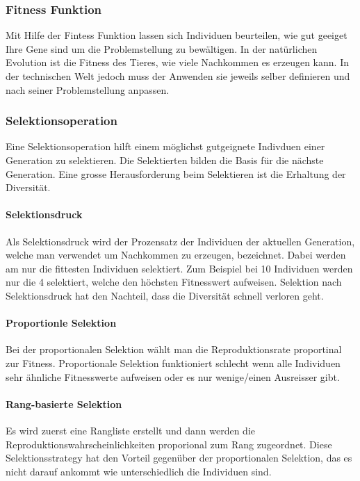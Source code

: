    \subsubsection{Fitness Funktion}
      Mit Hilfe der Fintess Funktion lassen sich Individuen beurteilen, wie gut geeiget Ihre Gene sind um die Problemstellung zu bewältigen.
      In der natürlichen Evolution ist die Fitness des Tieres, wie viele Nachkommen es erzeugen kann. In der technischen Welt jedoch muss der
      Anwenden sie jeweils selber definieren und nach seiner Problemstellung anpassen.

    \subsubsection{Selektionsoperation}
      Eine Selektionsoperation hilft einem möglichst gutgeignete Indivduen einer Generation zu selektieren.
      Die Selektierten bilden die Basis für die nächste Generation. Eine grosse Herausforderung beim Selektieren ist die Erhaltung der Diversität.

      \paragraph{Selektionsdruck}
        Als Selektionsdruck wird der Prozensatz der Individuen der aktuellen Generation, welche man verwendet um Nachkommen zu erzeugen, bezeichnet.
        Dabei werden am nur die fittesten Individuen selektiert. Zum Beispiel bei 10 Individuen werden nur die 4 selektiert, welche den höchsten Fitnesswert aufweisen.
        Selektion nach Selektionsdruck hat den Nachteil, dass die Diversität schnell verloren geht.

      \paragraph{Proportionle Selektion}
        Bei der proportionalen Selektion wählt man die Reproduktionsrate proportinal zur Fitness.
        Proportionale Selektion funktioniert schlecht wenn alle Individuen sehr ähnliche Fitnesswerte aufweisen oder es nur wenige/einen Ausreisser gibt.

      \paragraph{Rang-basierte Selektion}
        Es wird zuerst eine Rangliste erstellt und dann werden die Reproduktionswahrscheinlichkeiten proporional zum Rang zugeordnet.
        Diese Selektionsstrategy hat den Vorteil gegenüber der proportionalen Selektion, das es nicht darauf ankommt wie unterschiedlich die Individuen sind.

